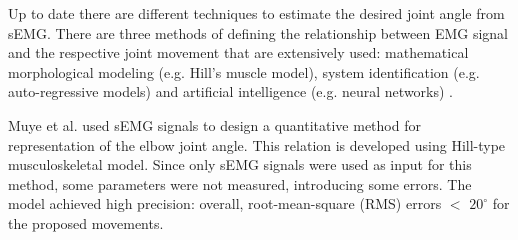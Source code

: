\documentclass[letterpaper, 10 pt, conference]{ieeeconf}  %
\begin{document}


Up to date there are different techniques to estimate the desired joint angle from sEMG. There are three methods of defining the relationship between EMG signal and the respective joint movement that are extensively used: mathematical morphological modeling (e.g. Hill's muscle model), system identification (e.g. auto-regressive models) and artificial intelligence (e.g. neural networks) \cite{Anam2012988}. 

Muye et al. \cite{Pang2015165} used sEMG signals to design a quantitative method for representation of the elbow joint angle. This relation is developed using Hill-type musculoskeletal model. Since only sEMG signals were used as input for this method, some parameters were not measured, introducing some errors. 
The model achieved high precision: overall, root-mean-square (RMS) errors \(<\) \(20^{\circ}\) for the proposed movements. 
% 
% 

% 
% 

\end{document}

